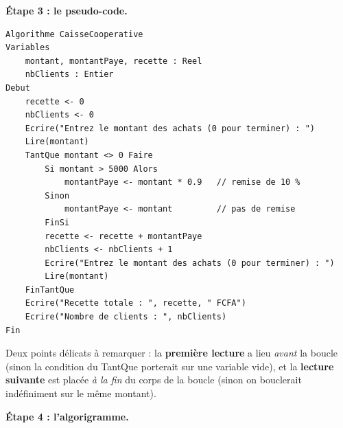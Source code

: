 \documentclass[11pt]{article}
\begin{document}
\begin{exoresolu}
\textbf{Étape 3 : le pseudo-code.}

\begin{lstlisting}
Algorithme CaisseCooperative
Variables
    montant, montantPaye, recette : Reel
    nbClients : Entier
Debut
    recette <- 0
    nbClients <- 0
    Ecrire("Entrez le montant des achats (0 pour terminer) : ")
    Lire(montant)
    TantQue montant <> 0 Faire
        Si montant > 5000 Alors
            montantPaye <- montant * 0.9   // remise de 10 %
        Sinon
            montantPaye <- montant         // pas de remise
        FinSi
        recette <- recette + montantPaye
        nbClients <- nbClients + 1
        Ecrire("Entrez le montant des achats (0 pour terminer) : ")
        Lire(montant)
    FinTantQue
    Ecrire("Recette totale : ", recette, " FCFA")
    Ecrire("Nombre de clients : ", nbClients)
Fin
\end{lstlisting}

Deux points délicats à remarquer : la \textbf{première lecture} a lieu \emph{avant} la boucle (sinon la condition du TantQue porterait sur une variable vide), et la \textbf{lecture suivante} est placée \emph{à la fin} du corps de la boucle (sinon on bouclerait indéfiniment sur le même montant).

\textbf{Étape 4 : l'algorigramme.}


\end{exoresolu}
\end{document}
